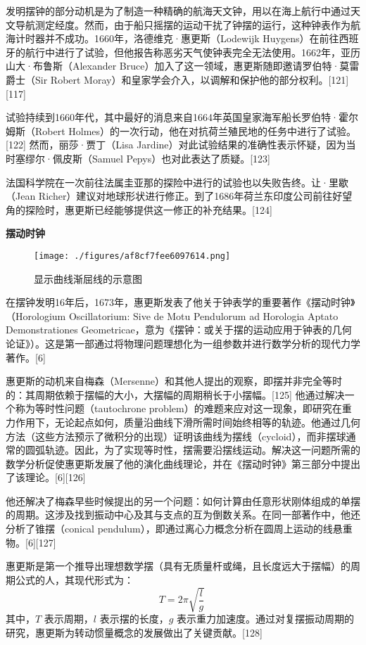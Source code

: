 发明摆钟的部分动机是为了制造一种精确的航海天文钟，用以在海上航行中通过天文导航测定经度。然而，由于船只摇摆的运动干扰了钟摆的运行，这种钟表作为航海计时器并不成功。1660年，洛德维克·惠更斯（Lodewijk Huygens）在前往西班牙的航行中进行了试验，但他报告称恶劣天气使钟表完全无法使用。1662年，亚历山大·布鲁斯（Alexander Bruce）加入了这一领域，惠更斯随即邀请罗伯特·莫雷爵士（Sir Robert Moray）和皇家学会介入，以调解和保护他的部分权利。[121][117]

试验持续到1660年代，其中最好的消息来自1664年英国皇家海军船长罗伯特·霍尔姆斯（Robert Holmes）的一次行动，他在对抗荷兰殖民地的任务中进行了试验。[122] 然而，丽莎·贾丁（Lisa Jardine）对此试验结果的准确性表示怀疑，因为当时塞缪尔·佩皮斯（Samuel Pepys）也对此表达了质疑。[123]

法国科学院在一次前往法属圭亚那的探险中进行的试验也以失败告终。让·里歇（Jean Richer）建议对地球形状进行修正。到了1686年荷兰东印度公司前往好望角的探险时，惠更斯已经能够提供这一修正的补充结果。[124]

\textbf{摆动时钟}
\begin{figure}[ht]
\centering
\texttt{[image: ./figures/af8cf7fee6097614.png]}
\caption{显示曲线渐屈线的示意图} \label{fig_HGS_11}
\end{figure}
在摆钟发明16年后，1673年，惠更斯发表了他关于钟表学的重要著作《摆动时钟》（Horologium Oscillatorium: Sive de Motu Pendulorum ad Horologia Aptato Demonstrationes Geometricae，意为《摆钟：或关于摆的运动应用于钟表的几何论证》）。这是第一部通过将物理问题理想化为一组参数并进行数学分析的现代力学著作。[6]

惠更斯的动机来自梅森（Mersenne）和其他人提出的观察，即摆并非完全等时的：其周期依赖于摆幅的大小，大摆幅的周期稍长于小摆幅。[125] 他通过解决一个称为等时性问题（tautochrone problem）的难题来应对这一现象，即研究在重力作用下，无论起点如何，质量沿曲线下滑所需时间始终相等的轨迹。他通过几何方法（这些方法预示了微积分的出现）证明该曲线为摆线（cycloid），而非摆球通常的圆弧轨迹。因此，为了实现等时性，摆需要沿摆线运动。解决这一问题所需的数学分析促使惠更斯发展了他的演化曲线理论，并在《摆动时钟》第三部分中提出了该理论。[6][126]

他还解决了梅森早些时候提出的另一个问题：如何计算由任意形状刚体组成的单摆的周期。这涉及找到振动中心及其与支点的互为倒数关系。在同一部著作中，他还分析了锥摆（conical pendulum），即通过离心力概念分析在圆周上运动的线悬重物。[6][127]

惠更斯是第一个推导出理想数学摆（具有无质量杆或绳，且长度远大于摆幅）的周期公式的人，其现代形式为：
\[{\displaystyle T=2\pi {\sqrt {\frac {l}{g}}}}~\]
其中，\(T\) 表示周期，\(l\) 表示摆的长度，\(g\) 表示重力加速度。通过对复摆振动周期的研究，惠更斯为转动惯量概念的发展做出了关键贡献。[128]

